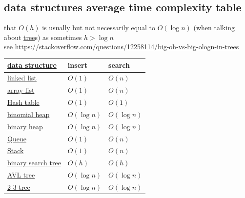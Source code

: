 \documentclass[a4paper,12pt]{article}
\begin{document}
\subsection{data structures average time complexity table}
\label{sec:orge3dab2d}
\begin{note}
that \(O(h)\) is usually but not necessarily equal to \(O(\log n)\) (when talking about \hyperref[sec:org6b67a14]{tree}s) as sometimes \(h > \log n\)\\[0pt]
see \url{https://stackoverflow.com/questions/12258114/big-oh-vs-big-ologn-in-trees}\\[0pt]
\end{note}
\begin{center}
\begin{tabular}{lll}
\hyperref[sec:org8f50ccd]{data structure} & insert & search\\[0pt]
\hline
\hyperref[sec:org3b67cf5]{linked list} & \(O(1)\) & \(O(n)\)\\[0pt]
\hyperref[sec:orgd284d9b]{array list} & \(O(1)\) & \(O(n)\)\\[0pt]
\hyperref[sec:org4f64d21]{Hash table} & \(O(1)\) & \(O(1)\)\\[0pt]
\hyperref[sec:orgd6615d4]{binomial heap} & \(O(\log n)\) & \(O(\log n)\)\\[0pt]
\hyperref[sec:orgff15739]{binary heap} & \(O(\log n)\) & \(O(\log n)\)\\[0pt]
\hyperref[sec:orga0bf8b2]{Queue} & \(O(1)\) & \(O(n)\)\\[0pt]
\hyperref[sec:org1fa0f82]{Stack} & \(O(1)\) & \(O(n)\)\\[0pt]
\hyperref[sec:orge1ff544]{binary search tree} & \(O(h)\) & \(O(h)\)\\[0pt]
\hyperref[sec:orge9da911]{AVL tree} & \(O(\log n)\) & \(O(\log n)\)\\[0pt]
\hyperref[sec:org1df410f]{2-3 tree} & \(O(\log n)\) & \(O(\log n)\)\\[0pt]
\end{tabular}
\end{center}
\end{document}

